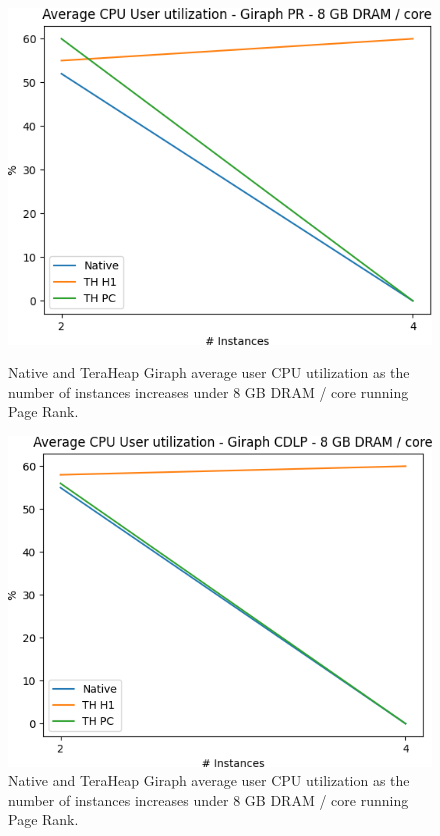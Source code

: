 \begin{figure}[thbp]
	\centering
        \includegraphics[width=\linewidth]{./fig/G_PR_128_USR.png}
    \caption{Native and TeraHeap Giraph average user CPU utilization
        as the number of instances increases under 8 GB DRAM / core running Page Rank.}
        \label{fig:g_pr128_usr}
        \includegraphics[width=\linewidth]{./fig/G_CDLP_128_USR.png}
    \caption{Native and TeraHeap Giraph average user CPU utilization
        as the number of instances increases under 8 GB DRAM / core running Page Rank.}
        \label{fig:g_cdlp128_usr}
\end{figure}

